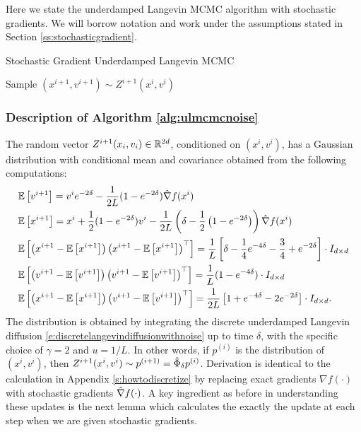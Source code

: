 \label{app:stochastic}
Here we state the underdamped Langevin MCMC algorithm with stochastic gradients. We will borrow notation and work under the assumptions stated in Section \ref{ss:stochasticgradient}.

\begin{algorithm}[t] \label{alg:ulmcmcnoise}
\caption{Stochastic Gradient Underdamped Langevin MCMC} 

      {
		  Sample $(x^{i+1},v^{i+1})\sim Z^{i+1}(x^i,v^i)$
        }
   \end{algorithm} 
\subsubsection*{Description of Algorithm \ref{alg:ulmcmcnoise}}
The random vector $Z^{i+1}(x_i,v_i)\in \mathbb{R}^{2d}$, conditioned on $(x^i,v^i)$, has a Gaussian distribution with conditional mean and covariance obtained from the following computations:
   \begin{align*}
&\mathbb{E}\left[v^{i+1}\right] = v^i e^{-2 \delta} - \frac{1}{2L}(1-e^{-2 \delta}) \hat{\nabla} f(x^i)\\
&\mathbb{E}\left[x^{i+1}\right]  = x^i + \frac{1}{2}(1-e^{-2 \delta})v^i - \frac{1}{2L} \left( \delta - \frac{1}{2}\left(1-e^{-2 \delta}\right) \right) \hat{\nabla}  f(x^i)\\
&\mathbb{E}\left[\left(x^{i+1} - \mathbb{E}\left[x^{i+1}\right]\right) \left(x^{i+1} - \mathbb{E}\left[x^{i+1}\right]\right)^{\top}\right]= \frac{1}{L } \left[\delta-\frac{1}{4}e^{-4\delta}-\frac{3}{4}+e^{-2\delta}\right] \cdot I_{d\times d}\\
&\mathbb{E}\left[\left(v^{i+1} - \mathbb{E}\left[v^{i+1}\right]\right) \left(v^{i+1} - \mathbb{E}\left[v^{i+1}\right]\right)^{\top}\right] = \frac{1}{L}(1-e^{-4 \delta})\cdot I_{d\times d}\\
&\mathbb{E}\left[\left(x^{i+1} - \mathbb{E}\left[x^{i+1}\right]\right) \left(v^{i+1} - \mathbb{E}\left[v^{i+1}\right]\right)^{\top}\right]= \frac{1}{2L} \left[1+e^{-4\delta}-2e^{-2\delta}\right] \cdot I_{d \times d}.
\end{align*}   
 The distribution is obtained by integrating the discrete underdamped Langevin diffusion \eqref{e:discretelangevindiffusionwithnoise} up to time $\delta$, with the specific choice of $\gamma=2$ and $u=1/L$. In other words, if $p^{(i)}$ is the distribution of $(x^i,v^i)$, then $Z^{i+1}(x^i,v^i) \sim p^{(i+1)} = \hat{\Phi}_{\delta} p^{(i)}$. Derivation is identical to the calculation in Appendix \ref{s:howtodiscretize} by replacing exact gradients $\nabla f(\cdot)$ with stochastic gradients $\hat{\nabla} f(\cdot)$. A key ingredient as before in understanding these updates is the next lemma which calculates the exactly the update at each step when we are given stochastic gradients.
